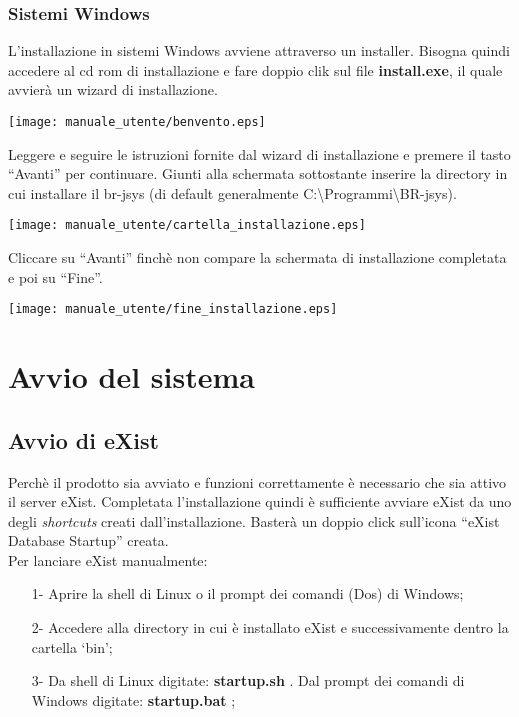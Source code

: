 \subsection{Sistemi Windows}
L'installazione in sistemi Windows avviene attraverso un installer. Bisogna quindi accedere al cd rom di installazione e fare doppio clik sul file  \textbf{install.exe}, il quale avvier\`a un wizard di installazione.
\begin{center}
\texttt{[image: manuale\_utente/benvento.eps]}\\
\end{center}
Leggere e seguire le istruzioni fornite dal wizard di installazione e premere il tasto ``Avanti'' per continuare.
Giunti alla schermata sottostante inserire la directory in cui installare il br-jsys (di default generalmente C:\textbackslash Programmi\textbackslash BR-jsys).
\begin{center}
\texttt{[image: manuale\_utente/cartella\_installazione.eps]}\\
\end{center}
Cliccare su ``Avanti'' finch\`e non compare la schermata di installazione completata e poi su ``Fine''.
\begin{center}
\texttt{[image: manuale\_utente/fine\_installazione.eps]}\\
\end{center}

\chapter{Avvio del sistema}
\section{Avvio di eXist}
Perch\`e il prodotto sia avviato e funzioni correttamente \`e necessario che sia attivo il server eXist. Completata l'installazione quindi è sufficiente avviare eXist da uno degli \textit{shortcuts} creati dall'installazione. Baster\`a un doppio click sull'icona ``eXist Database Startup'' creata.\\
Per lanciare eXist manualmente:
\begin{itemize}
\item[1-] Aprire la shell di Linux o il prompt dei comandi (Dos) di Windows;
\item[2-] Accedere alla directory in cui \`e installato eXist e successivamente dentro la cartella `bin';
\item[3-] Da shell di Linux digitate:  \textbf{startup.sh} . Dal prompt dei comandi di Windows digitate: \textbf{startup.bat}  ;
\end{itemize}	


